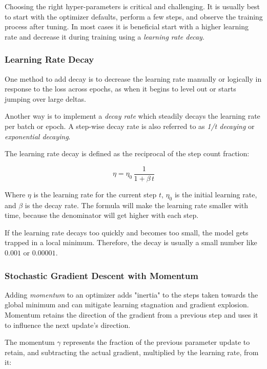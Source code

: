 \documentclass[a4paper]{article}
\begin{document}
Choosing the right hyper-parameters is critical and challenging. It is usually best to start with the optimizer defaults, perform a few steps, and observe the training process after tuning. In most cases it is beneficial start with a higher learning rate and decrease it during training using a \emph{learning rate decay}.

\subsubsection*{Learning Rate Decay}
One method to add decay is to decrease the learning rate manually or logically in response to the loss across epochs, as when it begins to level out or starts jumping over large deltas. 

Another way is to implement a \emph{decay rate} which steadily decays the learning rate per batch or epoch. A step-wise decay rate is also referred to as \emph{1/t decaying} or \emph{exponential decaying}. 

The learning rate decay is defined as the reciprocal of the step count fraction:

\begin{equation*}
    \eta = \eta_0 \, \frac{1}{1 + \beta \, t}
\end{equation*}

Where $\eta$ is the learning rate for the current step $t$, $\eta_0$ is the initial learning rate, and $\beta$ is the decay rate. The formula will make the learning rate smaller with time, because the denominator will get higher with each step.

If the learning rate decays too quickly and becomes too small, the model gets trapped in a local minimum. Therefore, the decay is usually a small number like $0.001$ or $0.00001$.

\subsubsection*{Stochastic Gradient Descent with Momentum}
Adding \emph{momentum} to an optimizer adds "inertia" to the steps taken towards the global minimum and can mitigate learning stagnation and gradient explosion. Momentum retains the direction of the gradient from a previous step and uses it to influence the next update's direction.

The momentum $\gamma$ represents the fraction of the previous parameter update to retain, and subtracting the actual gradient, multiplied by the learning rate, from it:
\end{document}
